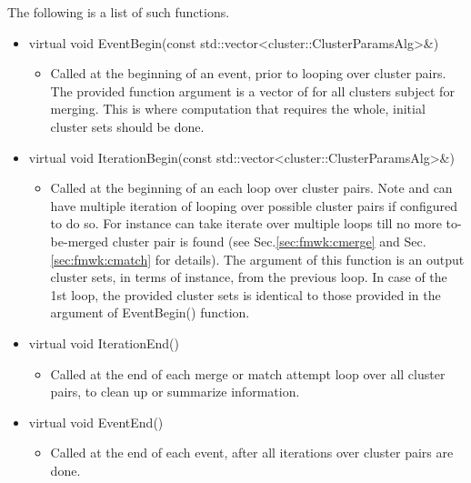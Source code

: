 The following is a list of such {\cbalgo} functions.
\begin{itemize}

\item[]{\ttfamily virtual void EventBegin(const std::vector<cluster::ClusterParamsAlg>\&)}
  \begin{itemize}
    \item Called at the beginning of an event, prior to looping over cluster pairs. The provided function argument is a vector of {\cpan} for all clusters subject for merging. This is where computation that requires the whole, initial cluster sets should be done.
  \end{itemize}

\item[]{\ttfamily virtual void IterationBegin(const std::vector<cluster::ClusterParamsAlg>\&)}
  \begin{itemize}
    \item Called at the beginning of an each loop over cluster pairs. Note {\cmerge} and {\cmatch} can have multiple iteration of looping over possible cluster pairs if configured to do so. For instance {\cmerge} can take iterate over multiple loops till no more to-be-merged  cluster pair is found (see Sec.\ref{sec:fmwk:cmerge} and Sec.\ref{sec:fmwk:cmatch} for details). The argument of this function is an output cluster sets, in terms of {\cpan} instance, from the previous loop. In case of the 1st loop, the provided cluster sets is identical to those provided in the argument of {\ttfamily EventBegin()} function.
  \end{itemize}

\item[]{\ttfamily virtual void IterationEnd()}
  \begin{itemize}
    \item Called at the end of each merge or match attempt loop over all cluster pairs, to clean up or summarize information.
  \end{itemize}

\item[]{\ttfamily virtual void EventEnd()}
  \begin{itemize}
    \item Called at the end of each event, after all iterations over cluster pairs are done.
  \end{itemize}

\end{itemize}

